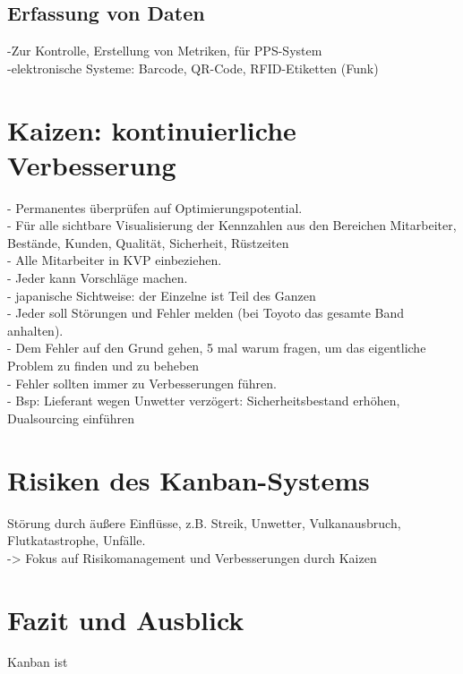 \subsection{Erfassung von Daten}
-Zur Kontrolle, Erstellung von Metriken, für PPS-System\\
-elektronische Systeme: Barcode, QR-Code, RFID-Etiketten (Funk)\\

\section{Kaizen: kontinuierliche Verbesserung}
- Permanentes überprüfen auf Optimierungspotential.\\
- Für alle sichtbare Visualisierung der Kennzahlen aus den Bereichen Mitarbeiter, Bestände, Kunden, Qualität, Sicherheit, Rüstzeiten\\
- Alle Mitarbeiter in KVP einbeziehen.\\
- Jeder kann Vorschläge machen.\\
- japanische Sichtweise: der Einzelne ist Teil des Ganzen\\
- Jeder soll Störungen und Fehler melden (bei Toyoto das gesamte Band anhalten).\\
- Dem Fehler auf den Grund gehen, 5 mal warum fragen, um das eigentliche Problem zu finden und zu beheben\\
- Fehler sollten immer zu Verbesserungen führen.\\
- Bsp: Lieferant wegen Unwetter verzögert: Sicherheitsbestand erhöhen, Dualsourcing einführen\\

\section{Risiken des Kanban-Systems}
Störung durch äußere Einflüsse, z.B. Streik, Unwetter, Vulkanausbruch, Flutkatastrophe, Unfälle.\\
-> Fokus auf Risikomanagement und Verbesserungen durch Kaizen\\

\section{Fazit und Ausblick}
Kanban ist 
